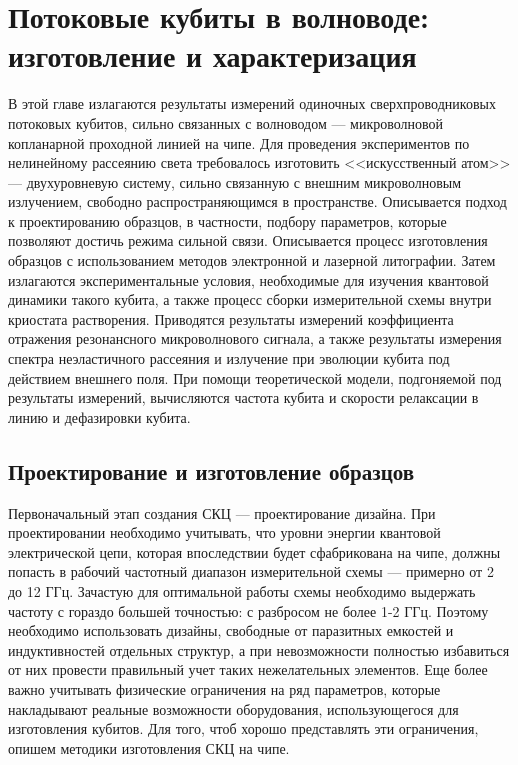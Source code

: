 \chapter{Потоковые кубиты в волноводе: изготовление и характеризация}

В этой главе излагаются результаты измерений одиночных сверхпроводниковых потоковых кубитов, сильно связанных с волноводом --- микроволновой копланарной проходной линией на чипе. Для проведения экспериментов по нелинейному рассеянию света требовалось изготовить <<искусственный атом>> --- двухуровневую систему, сильно связанную с внешним микроволновым излучением, свободно распространяющимся в пространстве. Описывается подход к проектированию образцов, в частности, подбору параметров, которые позволяют достичь режима сильной связи. Описывается процесс изготовления образцов с использованием методов электронной и лазерной литографии. Затем излагаются экспериментальные условия, необходимые для изучения квантовой динамики такого кубита, а также процесс сборки измерительной схемы внутри криостата растворения. Приводятся результаты измерений коэффициента отражения резонансного микроволнового сигнала, а также результаты измерения спектра неэластичного рассеяния и излучение при эволюции кубита под действием внешнего поля. При помощи теоретической модели, подгоняемой под результаты измерений, вычисляются частота кубита и скорости релаксации в линию и дефазировки кубита. 



\section{Проектирование и изготовление образцов}
Первоначальный этап создания СКЦ --- проектирование дизайна. При проектировании необходимо учитывать, что уровни энергии квантовой электрической цепи, которая впоследствии будет сфабрикована на чипе, должны попасть в рабочий частотный диапазон измерительной схемы --- примерно от 2 до 12 ГГц. Зачастую для оптимальной работы схемы необходимо выдержать частоту с гораздо большей точностью: с разбросом не более 1-2 ГГц. Поэтому необходимо использовать дизайны, свободные от паразитных емкостей и индуктивностей отдельных структур, а при невозможности полностью избавиться от них провести правильный учет таких нежелательных элементов. Еще более важно учитывать физические ограничения на ряд параметров, которые накладывают реальные возможности оборудования, использующегося для изготовления кубитов. Для того, чтоб хорошо представлять эти ограничения, опишем методики изготовления СКЦ на чипе. 

